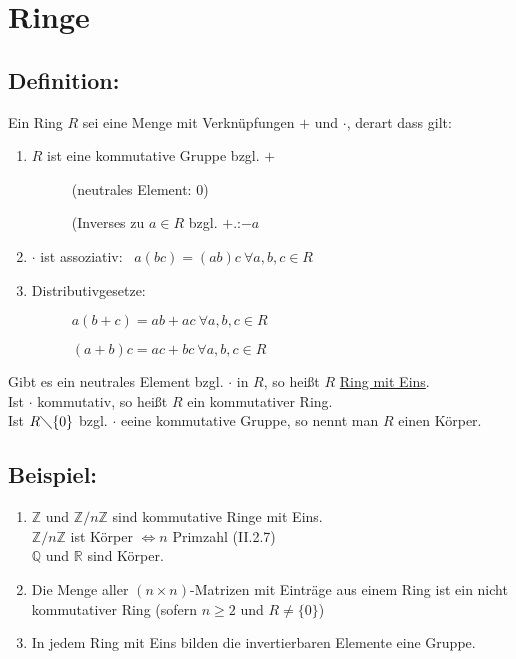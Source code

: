 \section{Ringe}
%
%
%
\subsection{Definition:}
Ein Ring $R$ sei eine Menge mit Verknüpfungen $+$ und $\cdot$, derart dass gilt:
\begin{enumerate}
	\item $R$ ist eine kommutative Gruppe bzgl. $+$ 
	\begin{description}
		\item[] (neutrales Element: 0)
		\item[] (Inverses zu $a \in R$ bzgl. $+$.:$-a$
	\end{description}
	\item $\cdot$ ist assoziativ: \ $a(bc)=(ab)c \ \forall a,b,c \in R$
	\item Distributivgesetze:
	\begin{description}
		\item[] $a(b+c) = ab + ac \ \forall a,b,c \in R$
		\item[] $(a+b)c = ac + bc \ \forall a,b,c \in R$
	\end{description}
\end{enumerate}
Gibt es ein neutrales Element bzgl. $\cdot$ in $R$, so heißt $R$ \underline{Ring mit Eins}.\\
Ist $\cdot$ kommutativ, so heißt $R$ ein kommutativer Ring. \\
Ist $R\diagdown\{0\}$ bzgl. $\cdot$ eeine kommutative Gruppe, so nennt man $R$ einen Körper.
%
%
%
\subsection{Beispiel:}
\begin{enumerate}[label={(\alph*)}]
	\item $\mathbb{Z}$ und $\mathbb{Z}/n\mathbb{Z}$ sind kommutative Ringe mit Eins.\\
		$\mathbb{Z}/n\mathbb{Z}$ ist Körper $\Leftrightarrow n$ Primzahl (II.2.7)\\
		$\mathbb{Q}$ und $\mathbb{R}$ sind Körper.
	\item Die Menge aller $(n \times n)$-Matrizen mit Einträge aus einem Ring ist ein nicht kommutativer Ring (sofern $n \geq 
		2$ und $R \neq \{0\}$)
	\item In jedem Ring mit Eins bilden die invertierbaren Elemente eine Gruppe.
  \end{enumerate} 
%
%
%

